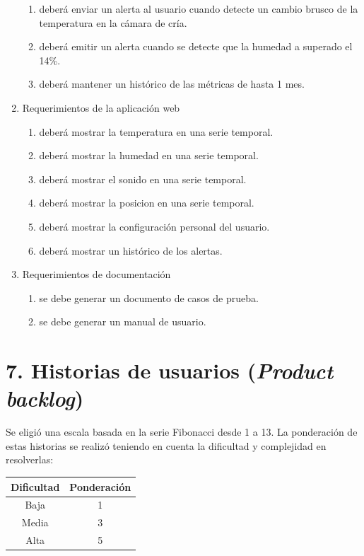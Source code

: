 \documentclass[
11pt, %
codirector, %
]{charter}
\begin{document}
\begin{enumerate}
\begin{enumerate}
			\item deberá enviar un alerta al usuario cuando detecte un cambio brusco de la temperatura en la cámara de cría.
			\item deberá emitir un alerta cuando se detecte que la humedad a superado el 14\%.
			\item deberá mantener un histórico de las métricas de hasta 1 mes.
		\end{enumerate}
	\item Requerimientos de la aplicación web
		\begin{enumerate}		
			\item deberá mostrar la temperatura en una serie temporal.
			\item deberá mostrar la humedad en una serie temporal.
			\item deberá mostrar el sonido en una serie temporal.	
			\item deberá mostrar la posicion en una serie temporal.
			\item deberá mostrar la configuración personal del usuario.
			\item deberá mostrar un histórico de los alertas.
		\end{enumerate}
	\item Requerimientos de documentación
		\begin{enumerate}
			\item se debe generar un documento de casos de prueba.
			\item se debe generar un manual de usuario.
		\end{enumerate}	
\end{enumerate}


\section{7. Historias de usuarios (\textit{Product backlog})}
\label{sec:backlog}

Se eligió una escala basada en la serie Fibonacci desde 1 a 13.
La ponderación de estas historias se realizó teniendo en cuenta la dificultad y complejidad en resolverlas:

\begin{tabular}{|c|c|}
\hline
\rowcolor[HTML]{C0C0C0} 
Dificultad & Ponderación \\ \hline
Baja      & 1 \\ \hline
Media      & 3 \\ \hline
Alta      & 5 \\ \hline
\end{tabular}
\end{document}
